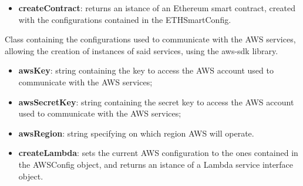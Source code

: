 	\begin{itemize}
		\item \textbf{createContract}: returns an istance of an Ethereum smart contract, created with the configurations contained in the ETHSmartConfig.
	\end{itemize}
	Class containing the configurations used to communicate with the AWS services, allowing the creation of instances of said services, using the aws-sdk library.
	\begin{itemize}
		\item \textbf{awsKey}: string containing the key to access the AWS account used to communicate with the AWS services;
		\item \textbf{awsSecretKey}: string containing the secret key to access the AWS account used to communicate with the AWS services;
		\item \textbf{awsRegion}: string specifying on which region AWS will operate.
	\end{itemize}
	\begin{itemize}
		\item \textbf{createLambda}: sets the current AWS configuration to the ones contained in the AWSConfig object, and returns an istance of a Lambda service interface object.
	\end{itemize}
